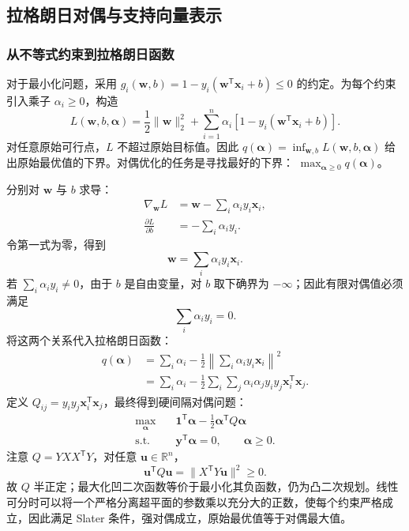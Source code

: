 \subsection{拉格朗日对偶与支持向量表示}

\subsubsection{从不等式约束到拉格朗日函数}

对于最小化问题，采用 $g_i(\boldsymbol w,b)=1-y_i(\boldsymbol w^{\mathsf T}\boldsymbol x_i+b)\leq0$ 的约定。为每个约束引入乘子 $\alpha_i\geq0$，构造
\begin{equation}\label{eq:svm-lagrangian-expanded}
L(\boldsymbol w,b,\boldsymbol\alpha)=
\frac12\|\boldsymbol w\|_2^2+
\sum_{i=1}^n\alpha_i[1-y_i(\boldsymbol w^{\mathsf T}\boldsymbol x_i+b)].
\end{equation}
对任意原始可行点，$L$ 不超过原始目标值。因此
$q(\boldsymbol\alpha)=\inf_{\boldsymbol w,b}L(\boldsymbol w,b,\boldsymbol\alpha)$
给出原始最优值的下界。对偶优化的任务是寻找最好的下界：
$\max_{\boldsymbol\alpha\geq0}q(\boldsymbol\alpha)$。

分别对 $\boldsymbol w$ 与 $b$ 求导：
\begin{align*}
\nabla_{\boldsymbol w}L
&=\boldsymbol w-\sum_i\alpha_i y_i\boldsymbol x_i,\\
\frac{\partial L}{\partial b}&=-\sum_i\alpha_i y_i.
\end{align*}
令第一式为零，得到
\begin{equation}\label{eq:svm-weight-expansion}
\boldsymbol w=\sum_i\alpha_i y_i\boldsymbol x_i.
\end{equation}
若 $\sum_i\alpha_i y_i\ne0$，由于 $b$ 是自由变量，对 $b$ 取下确界为 $-\infty$；因此有限对偶值必须满足
\begin{equation}\label{eq:svm-dual-balance}
\sum_i\alpha_i y_i=0.
\end{equation}
将这两个关系代入拉格朗日函数：
\begin{align*}
q(\boldsymbol\alpha)
&=\sum_i\alpha_i-\frac12\left\|\sum_i\alpha_i y_i\boldsymbol x_i\right\|^2\\
&=\sum_i\alpha_i-\frac12\sum_i\sum_j
\alpha_i\alpha_j y_i y_j\boldsymbol x_i^{\mathsf T}\boldsymbol x_j.
\end{align*}
定义 $Q_{ij}=y_i y_j\boldsymbol x_i^{\mathsf T}\boldsymbol x_j$，最终得到硬间隔对偶问题：
\begin{equation}\label{eq:svm-hard-dual}
\begin{aligned}
\max_{\boldsymbol\alpha}\quad&
\boldsymbol1^{\mathsf T}\boldsymbol\alpha-\frac12\boldsymbol\alpha^{\mathsf T}Q\boldsymbol\alpha\\
\text{s.t.}\quad&\boldsymbol y^{\mathsf T}\boldsymbol\alpha=0,\qquad \boldsymbol\alpha\geq0.
\end{aligned}
\end{equation}
注意 $Q=YXX^{\mathsf T}Y$，对任意 $\boldsymbol u\in\mathbb R^n$，
\[
\boldsymbol u^{\mathsf T}Q\boldsymbol u=\|X^{\mathsf T}Y\boldsymbol u\|^2\geq0.
\]
故 $Q$ 半正定；最大化凹二次函数等价于最小化其负函数，仍为凸二次规划。线性可分时可以将一个严格分离超平面的参数乘以充分大的正数，使每个约束严格成立，因此满足 Slater 条件，强对偶成立，原始最优值等于对偶最大值。

